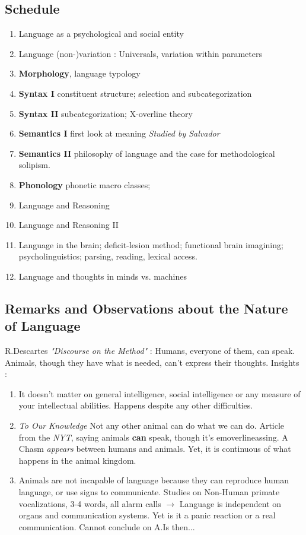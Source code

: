 \documentclass{cours}
\begin{document}
\subsection*{Schedule}
\begin{enumerate} 
    \item Language as a psychological and social entity
    \item Language (non-)variation\! : Universals, variation within parameters
    \item \textbf{Morphology}, language typology
    \item \textbf{Syntax I} constituent structure; selection and subcategorization
    \item \textbf{Syntax II} subcategorization; X-overline theory
    \item \textbf{Semantics I} first look at meaning \textsl{Studied by Salvador}
    \item \textbf{Semantics II} philosophy of language and the case for methodological solipism.
    \item \textbf{Phonology} phonetic macro classes;
    \item Language and Reasoning
    \item Language and Reasoning II
    \item Language in the brain; deficit-lesion method; functional brain imagining; psycholinguistics; parsing, reading, lexical access.
    \item Language and thoughts in minds vs. machines
\end{enumerate}

\subsection{Remarks and Observations about the Nature of Language}
R.Descartes \textit{"Discourse on the Method"}\! : Humans, everyone of them, can speak. Animals, though they have what is needed, can't express their thoughts.
Insights\! :
\begin{enumerate}
    \item It doesn't matter on general intelligence, social intelligence or any measure of your intellectual abilities. Happens despite any other difficulties.
    \item \emph{To Our Knowledge} Not any other animal can do what we can do. Article from the \textit{NYT}, saying animals \textbf{can} speak, though it's emoverlineassing. A Chasm \textit{appears} between humans and animals. Yet, it is continuous of what happens in the animal kingdom.
    \item Animals are not incapable of language because they can reproduce human language, or use signs to communicate. Studies on Non-Human primate vocalizations, 3-4 words, all alarm calls $\rightarrow$ Language is independent on organs and communication systems. Yet is it a panic reaction or a real communication. Cannot conclude on A.Is then...
\end{enumerate}
\end{document}
